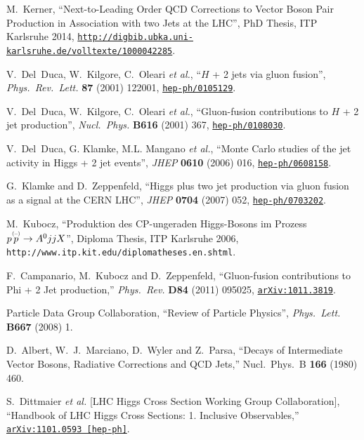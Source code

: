 \documentclass[english,12pt]{article}
\begin{document}
\begin{thebibliography}{10}
  M.~Kerner,
  ``Next-to-Leading Order QCD Corrections to Vector Boson Pair Production in Association with two Jets at the LHC'',
  {PhD Thesis, ITP Karlsruhe 2014}, 
\href{http://digbib.ubka.uni-karlsruhe.de/volltexte/1000042285}{{\tt http://digbib.ubka.uni-karlsruhe.de/volltexte/1000042285}}.

V.~Del~Duca, W.~Kilgore, C.~Oleari {\it et al.}, ``{$H$ + 2
  jets via gluon fusion}'', {\em Phys.\ Rev.\ Lett.} {\bf 87} (2001) 122001,
\href{http://www.arXiv.org/abs/hep-ph/0105129}{{\tt hep-ph/0105129}}.

V.~Del~Duca, W.~Kilgore, C.~Oleari {\it et al.},
  ``{Gluon-fusion contributions to $H$ + 2 jet production}'', {\em Nucl.\ Phys.}
  {\bf B616} (2001) 367,
\href{http://www.arXiv.org/abs/hep-ph/0108030}{{\tt hep-ph/0108030}}.

V.~Del~Duca, G. Klamke, M.L. Mangano {\it et al.}, ``{Monte Carlo studies of the jet activity in Higgs +
  2 jet events}'', {\em JHEP} {\bf 0610} (2006) 016,
\href{http://www.arXiv.org/abs/hep-ph/0608158}{{\tt hep-ph/0608158}}.

G.~Klamke and D.~Zeppenfeld, ``{Higgs plus two jet production via gluon fusion
  as a signal at the CERN LHC}'', {\em JHEP} {\bf 0704} (2007) 052,
\href{http://www.arXiv.org/abs/hep-ph/0703202}{{\tt hep-ph/0703202}}.

M.~Kubocz, ``Produktion des CP-ungeraden Higgs-Bosons im Prozess $p \overset{\mbox{\tiny{(--)}}}{p} \to
  A^{0}jjX$'', {Diploma Thesis, ITP Karlsruhe 2006}, {{\tt http://www.itp.kit.edu/diplomatheses.en.shtml}}.

  F.~Campanario, M.~Kubocz and D.~Zeppenfeld,
  ``Gluon-fusion contributions to Phi + 2 Jet production,''
  {\em Phys.\ Rev.} {\bf D84} (2011) 095025,
  \href{http://www.arXiv.org/abs/1011.3819}{{\tt arXiv:1011.3819}}.

{Particle Data Group} Collaboration, ``{Review of
  Particle Physics}'', {\em Phys.\ Lett.} {\bf B667} (2008) 1.

  D.~Albert, W.~J.~Marciano, D.~Wyler and Z.~Parsa,
  ``Decays of Intermediate Vector Bosons, Radiative Corrections and QCD Jets,''
  Nucl.\ Phys.\ B {\bf 166} (1980) 460.

  S.~Dittmaier {\it et al.} [LHC Higgs Cross Section Working Group Collaboration],
  ``Handbook of LHC Higgs Cross Sections: 1. Inclusive Observables,''
  \href{http://www.arXiv.org/abs/1101.0593}{\tt arXiv:1101.0593 [hep-ph]}.


\end{thebibliography}
\end{document}
